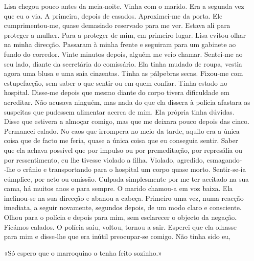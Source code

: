 Lisa chegou pouco antes da meia­‑noite. Vinha com o marido. Era a
segunda vez que eu o via. A primeira, depois de casados. Aproximei­‑me
da porta. Ele cumprimentou­‑me, quase demasiado reservado para me ver.
Estava ali para proteger a mulher. Para a proteger de mim, em primeiro
lugar. Lisa evitou olhar na minha direcção. Passaram à minha frente e
seguiram para um gabinete ao fundo do corredor. Vinte minutos depois,
alguém me veio chamar. Sentei­‑me ao seu lado, diante da secretária do
comissário. Ela tinha mudado de roupa, vestia agora uma blusa e uma saia
cinzentas. Tinha as pálpebras secas. Fixou­‑me com estupefacção, sem
saber o que sentir ou em quem confiar. Tinha estado no hospital.
Disse­‑me depois que mesmo diante do corpo tivera dificuldade em
acreditar. Não acusava ninguém, mas nada do que ela dissera à polícia
afastara as suspeitas que pudessem alimentar acerca de mim. Ela própria
tinha dúvidas. Disse que estivera a almoçar comigo, mas que me deixara
pouco depois das cinco. Permaneci calado. No caos que irrompera no meio
da tarde, aquilo era a única coisa que de facto me feria, quase a única
coisa que eu conseguia sentir. Saber que ela achava possível que por
impulso ou por premeditação, por represália ou por ressentimento, eu lhe
tivesse violado a filha. Violado, agredido, esmagando­‑lhe o crânio e
transportando para o hospital um corpo quase morto. Sentir­‑se­‑ia
cúmplice, por acto ou omissão. Culpada simplesmente por me ter aceitado
na sua cama, há muitos anos e para sempre. O marido chamou­‑a em voz
baixa. Ela inclinou­‑se na sua direcção e abanou a cabeça. Primeiro uma
vez, numa reacção imediata, a seguir novamente, segundos depois, de um
modo claro e consciente. Olhou para o polícia e depois para mim, sem
esclarecer o objecto da negação. Ficámos calados. O polícia saiu,
voltou, tornou a sair. Esperei que ela olhasse para mim e disse­‑lhe que
era inútil preocupar­‑se comigo. Não tinha sido eu,

«Só espero que o marroquino o tenha feito sozinho.»

